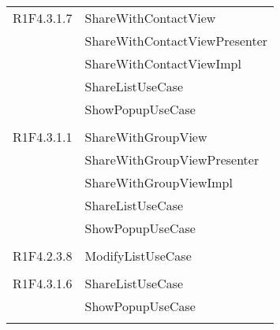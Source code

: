 \begin{center}
\begin{longtable}{|p{7cm}|p{7cm}|}
		R1F4.3.1.7 & ShareWithContactView \\ & ShareWithContactViewPresenter \\ & ShareWithContactViewImpl \\ & ShareListUseCase \\ & ShowPopupUseCase \\ & \\ \hline
		R1F4.3.1.1 & ShareWithGroupView \\ & ShareWithGroupViewPresenter \\ & ShareWithGroupViewImpl \\ & ShareListUseCase \\ & ShowPopupUseCase \\ & \\ \hline
		R1F4.2.3.8 & ModifyListUseCase \\ & \\ \hline
		R1F4.3.1.6 & ShareListUseCase \\ & ShowPopupUseCase \\ & \\ \hline
	\end{longtable}
\end{center}
